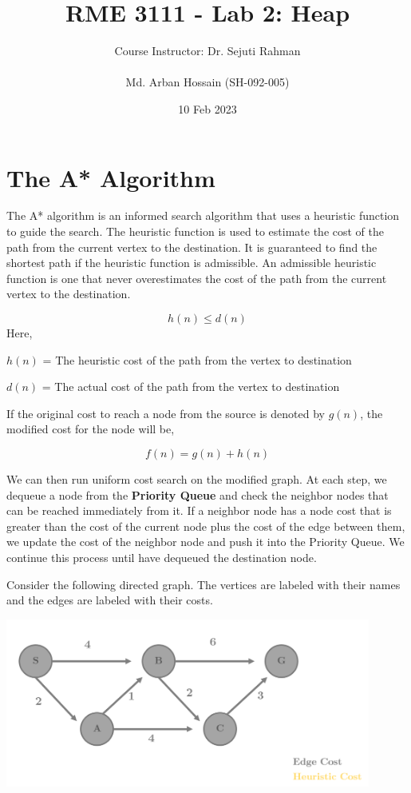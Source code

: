 \documentclass[12pt]{article}
\title{RME 3111 - Lab 2: Heap}
\author{
    Course Instructor: Dr. Sejuti Rahman\\
    \\
    Md. Arban Hossain (SH-092-005)\\
    }
\date{10 Feb 2023}
\begin{document}

\maketitle


\section*{The A* Algorithm}
The A* algorithm is an informed search algorithm that uses a heuristic function to guide the search. The heuristic function is used to estimate the cost of the path from the current vertex to the destination. It is guaranteed to find the shortest path if the heuristic function is admissible. An admissible heuristic function is one that never overestimates the cost of the path from the current vertex to the destination.

\[ h(n) \leq d(n) \]
\noindent
Here,

$h(n)$ = The heuristic cost of the path from the vertex to destination

$d(n)$ = The actual cost of the path from the vertex to destination

\noindent
If the original cost to reach a node from the source is denoted by $g(n)$, the modified cost for the node will be,

\[f(n) = g(n) + h(n)\]

We can then run uniform cost search on the modified graph. At each step, we dequeue a node from the \textbf{Priority Queue} and check the neighbor nodes that can be reached immediately from it. If a neighbor node has a node cost that is greater than the cost of the current node plus the cost of the edge between them, we update the cost of the neighbor node and push it into the Priority Queue. We continue this process until have dequeued the destination node.

\pagebreak


Consider the following directed graph. The vertices are labeled with their names and the edges are labeled with their costs.

\begin{center}
  \includegraphics[width=0.9\textwidth]{Graph.png}
\end{center}
\end{document}
